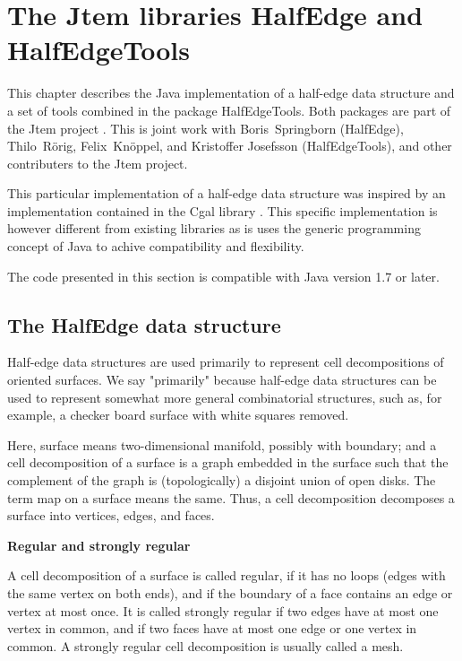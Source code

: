\documentclass[Thesis.tex]{subfiles}
\begin{document}
\chapter{The {\sc Jtem} libraries {\sc HalfEdge} and {\sc HalfEdgeTools}}

This chapter describes the {\sc Java} implementation of a half-edge data structure and a set of tools
combined in the package {\sc HalfEdgeTools}. Both packages are part of the {\sc Jtem} project
\cite{JtemWebsite}. This is joint work with Boris~Springborn ({\sc HalfEdge}), Thilo~R{\"o}rig, 
Felix~Kn{\"o}ppel, and Kristoffer Josefsson ({\sc HalfEdgeTools}), and
other contributers to the {\sc Jtem} project.

This particular implementation of a half-edge data structure was inspired by an implementation 
contained in the {\sc Cgal} library \cite{Kettner2000}.
This specific implementation is however different from existing libraries as is uses the generic
programming concept of {\sc Java} to achive compatibility and flexibility.

The code presented in this section is compatible with {\sc Java} version 1.7 or later.

\label{sec:halfedge_halfedgetools}
\section{The {\sc HalfEdge} data structure}

Half-edge data structures are used primarily to represent cell decompositions of oriented surfaces.
We say "primarily" because half-edge data structures can be used to represent somewhat more general
combinatorial structures, such as, for example, a checker board surface with white squares removed.

Here, surface means two-dimensional manifold, possibly with boundary; and a cell decomposition 
of a surface is a graph embedded in the surface such that the complement of the graph is 
(topologically) a disjoint union of open disks. The term map on a surface means the same. 
Thus, a cell decomposition decomposes a surface into vertices, edges, and faces.

{\bf Regular and strongly regular}

A cell decomposition of a surface is called regular, if it has no loops (edges with the same vertex 
on both ends), and if the boundary of a face contains an edge or vertex at most once. It is called 
strongly regular if two edges have at most one vertex in common, and if two faces have at most 
one edge or one vertex in common. A strongly regular cell decomposition is usually called a mesh.
\end{document}
